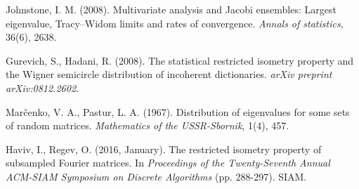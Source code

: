 \documentclass[a4paper,12pt]{article}
\begin{document}
\begin{thebibliography}{1}




Johnstone, I. M. (2008). Multivariate analysis and Jacobi ensembles: Largest eigenvalue, Tracy--Widom limits and rates of convergence. \emph{Annals of statistics}, 36(6), 2638.


 Gurevich, S., Hadani, R. (2008). The statistical restricted isometry property and the Wigner semicircle distribution of incoherent dictionaries. \emph{arXiv preprint arXiv:0812.2602}.


 Mar{\v{c}}enko, V. A., Pastur, L. A. (1967). Distribution of eigenvalues for some sets of random matrices. \emph{Mathematics of the USSR-Sbornik}, 1(4), 457.


 Haviv, I., Regev, O. (2016, January). The restricted isometry property of subsampled Fourier matrices. In \emph{Proceedings of the Twenty-Seventh Annual ACM-SIAM Symposium on Discrete Algorithms} (pp. 288-297). SIAM.



\end{thebibliography}
\end{document}
